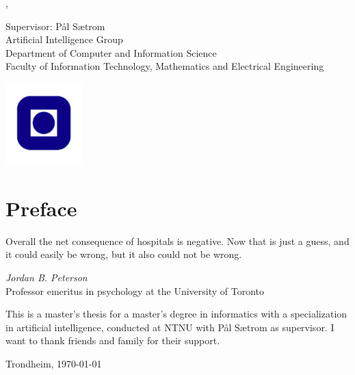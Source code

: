 \begin{titlepage}
\noindent {\large \textbf{\thesisAuthor}}
\vspace{2cm}

\noindent {\Huge \thesisTitle}
\vspace{2cm}

\noindent \thesisType, \thesisDate 
\vspace{2cm}

\noindent Supervisor: Pål Sætrom\\ Artificial Intelligence Group\\ Department of Computer and Information Science\\ Faculty of Information Technology, Mathematics and Electrical Engineering\\

\vfill
\begin{center}
\includegraphics[width=3cm]{figs/NTNUlogo.pdf}
\end{center}
\end{titlepage}

\thispagestyle{empty}

\cleardoublepage

\frontmatter



\clearpage

\section*{Preface}



\vspace{1cm}

\epigraph{Overall the net consequence of hospitals is negative. Now that is just a guess, and it could easily be wrong, but it also could not be wrong.}{\textit{Jordan B. Peterson} \\ Professor emeritus in psychology at the University of Toronto}

This is a master's thesis for a master's degree in informatics with a specialization in artificial intelligence, conducted at NTNU with Pål Sætrom as supervisor. I want to thank friends and family for their support.

\vfill

\hfill \thesisAuthor

\hfill Trondheim, \today

\clearpage

\tableofcontents

\listoffigures

\listoftables

